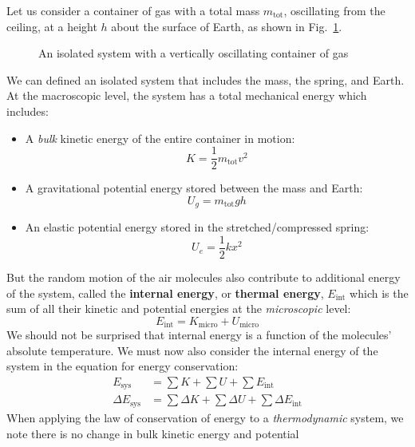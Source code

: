 Let us consider a container of gas with a total mass $m_\text{tot}$, oscillating
from the ceiling, at a height $h$ about the surface of Earth, as shown in
Fig.~\ref{fig:big-system}.
\begin{figure}[ht]
  \centering
  
  \caption{An isolated system with a vertically oscillating container of gas}
  \label{fig:big-system}
\end{figure}
We can defined an isolated system that includes the mass, the spring, and
Earth. At the macroscopic level, the system has a total mechanical energy which
includes:
\begin{itemize}
\item A \emph{bulk} kinetic energy of the entire container in motion:
  \begin{equation*}
    K=\dfrac12 m_\text{tot}v^2
  \end{equation*}
\item A gravitational potential energy stored between the mass and Earth:
  \begin{equation*}
    U_g=m_\text{tot}gh
  \end{equation*}

\item An elastic potential energy stored in the stretched/compressed spring:
  \begin{equation*}
    U_e=\frac12kx^2
  \end{equation*}
\end{itemize}
But the random motion of the air molecules also contribute to additional energy
of the system, called the \textbf{internal energy}, or \textbf{thermal energy},
$E_\text{int}$ which is the sum of all their kinetic and potential energies at
the \emph{microscopic} level:
\begin{equation}
  \boxed{
    E_\text{int}=K_\text{micro} + U_\text{micro}
  }
\end{equation}
We should not be surprised that internal energy is a function of the molecules'
absolute temperature. We must now also consider the internal energy of the
system in the equation for energy conservation:
\begin{align}
  E_\text{sys} &= \sum K + \sum U + \sum E_\text{int}\\
  \Delta E_\text{sys} &= \sum\Delta K + \sum\Delta U + \sum\Delta E_\text{int}
\end{align}
When applying the law of conservation of energy to a \emph{thermodynamic}
system, we note there is no change in bulk kinetic energy and potential
